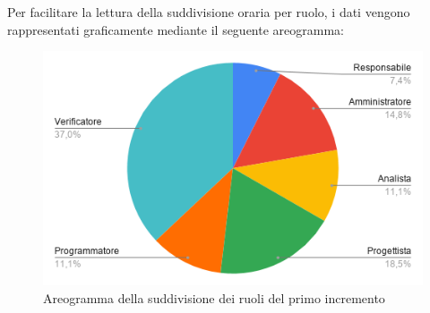 \documentclass[../piano-di-progetto.tex]{subfiles}
\begin{document}
  Per facilitare la lettura della suddivisione oraria per ruolo, i dati vengono rappresentati graficamente mediante il seguente areogramma:
  \begin{figure}[H]
    \centering
    \includegraphics[width=12cm]{img/ruoli-1-incr.png}
    \caption{Areogramma della suddivisione dei ruoli del primo incremento}
    \label{fig:ore-ruolo-progettazione}
  \end{figure}
\end{document}

